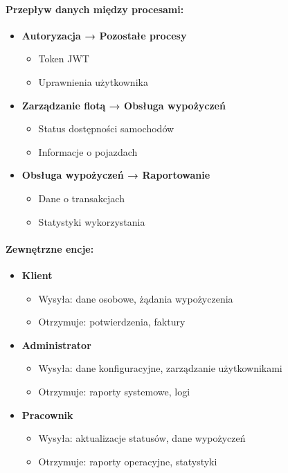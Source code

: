 \documentclass[12pt]{article}
\begin{document}
\paragraph{Przepływ danych między procesami:}
\begin{itemize}
    \item \textbf{Autoryzacja → Pozostałe procesy}
    \begin{itemize}
        \item Token JWT
        \item Uprawnienia użytkownika
    \end{itemize}

    \item \textbf{Zarządzanie flotą → Obsługa wypożyczeń}
    \begin{itemize}
        \item Status dostępności samochodów
        \item Informacje o pojazdach
    \end{itemize}

    \item \textbf{Obsługa wypożyczeń → Raportowanie}
    \begin{itemize}
        \item Dane o transakcjach
        \item Statystyki wykorzystania
    \end{itemize}
\end{itemize}

\paragraph{Zewnętrzne encje:}
\begin{itemize}
    \item \textbf{Klient}
    \begin{itemize}
        \item Wysyła: dane osobowe, żądania wypożyczenia
        \item Otrzymuje: potwierdzenia, faktury
    \end{itemize}

    \item \textbf{Administrator}
    \begin{itemize}
        \item Wysyła: dane konfiguracyjne, zarządzanie użytkownikami
        \item Otrzymuje: raporty systemowe, logi
    \end{itemize}

    \item \textbf{Pracownik}
    \begin{itemize}
        \item Wysyła: aktualizacje statusów, dane wypożyczeń
        \item Otrzymuje: raporty operacyjne, statystyki
    \end{itemize}
\end{itemize}
\end{document}
